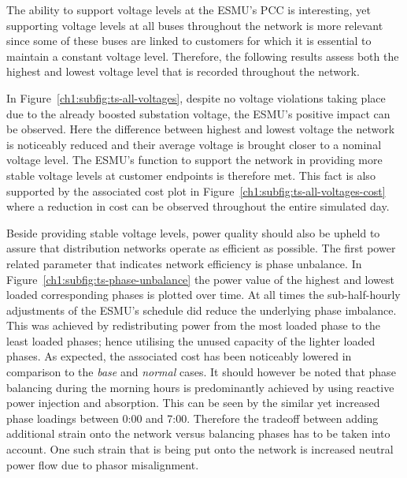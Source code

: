 The ability to support voltage levels at the ESMU's PCC is interesting, yet supporting voltage levels at all buses throughout the network is more relevant since some of these buses are linked to customers for which it is essential to maintain a constant voltage level.
Therefore, the following results assess both the highest and lowest voltage level that is recorded throughout the network.



In Figure~\ref{ch1:subfig:ts-all-voltages}, despite no voltage violations taking place due to the already boosted substation voltage, the ESMU's positive impact can be observed.
Here the difference between highest and lowest voltage  the network is noticeably reduced and their average voltage is brought closer to a nominal voltage level.
The ESMU's function to support the network in providing more stable voltage levels at customer endpoints is therefore met.
This fact is also supported by the associated cost plot in Figure~\ref{ch1:subfig:ts-all-voltages-cost} where a reduction in cost can be observed throughout the entire simulated day.



Beside providing stable voltage levels, power quality should also be upheld to assure that distribution networks operate as efficient as possible.
The first power related parameter that indicates network efficiency is phase unbalance.
In Figure~\ref{ch1:subfig:ts-phase-unbalance} the power value of the highest and lowest loaded corresponding phases is plotted over time.
At all times the sub-half-hourly adjustments of the ESMU's schedule did reduce the underlying phase imbalance.
This was achieved by redistributing power from the most loaded phase to the least loaded phases; hence utilising the unused capacity of the lighter loaded phases.
As expected, the associated cost has been noticeably lowered in comparison to the \textit{base} and \textit{normal} cases.
It should however be noted that phase balancing during the morning hours is predominantly achieved by using reactive power injection and absorption.
This can be seen by the similar yet increased phase loadings between 0:00 and 7:00.
Therefore the tradeoff between adding additional strain onto the network versus balancing phases has to be taken into account.
One such strain that is being put onto the network is increased neutral power flow due to phasor misalignment.

